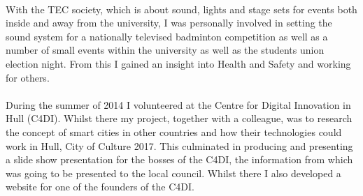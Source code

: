 \documentclass[12pt, a4paper]{article}
\begin{document}
\\
With the TEC society, which is about sound, lights and stage sets for events both inside and away from the university,
I was personally involved in setting the sound system for a nationally televised badminton competition as well as a number of small events within the university as well as the students union election night.
From this I gained an insight into Health and Safety and working for others.\\
\\
During the summer of 2014 I volunteered at the Centre for Digital Innovation in Hull (C4DI).
Whilst there my project, together with a colleague, was to research the concept of smart cities in other countries and how their technologies could work in Hull, City of Culture 2017.
This culminated in producing and presenting a slide show presentation for the bosses of the C4DI, the information from which was going to be presented to the local council.
Whilst there I also developed a website for one of the founders of the C4DI.\\
\end{document}
